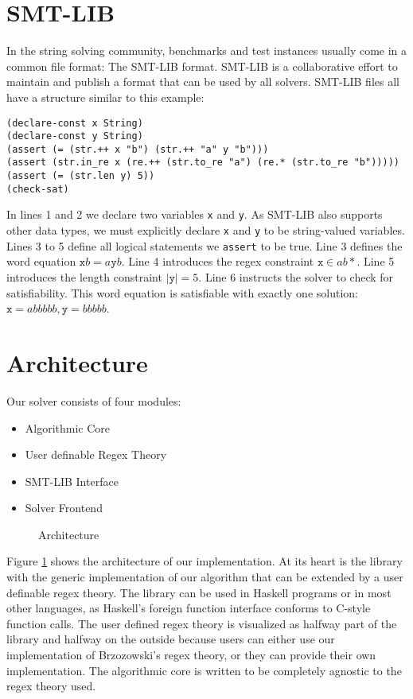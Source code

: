 \section{SMT-LIB}
In the string solving community, benchmarks and test instances usually come in a common file format: The SMT-LIB \cite{smtlib} format. SMT-LIB is a collaborative effort to maintain and publish a format that can be used by all solvers. SMT-LIB files all have a structure similar to this example:

\begin{verbatim}
(declare-const x String)
(declare-const y String)
(assert (= (str.++ x "b") (str.++ "a" y "b")))
(assert (str.in_re x (re.++ (str.to_re "a") (re.* (str.to_re "b")))))
(assert (= (str.len y) 5))
(check-sat)
\end{verbatim}

In lines 1 and 2 we declare two variables \texttt{x} and \texttt{y}. As SMT-LIB also supports other data types, we must explicitly declare \texttt{x} and \texttt{y} to be string-valued variables. Lines 3 to 5 define all logical statements we \texttt{assert} to be true. Line 3 defines the word equation $\texttt{x}b = a\texttt{y}b$. Line 4 introduces the regex constraint $\texttt{x} \in ab*$. Line 5 introduces the length constraint $|\texttt{y}| = 5$. Line 6 instructs the solver to check for satisfiability. This word equation is satisfiable with exactly one solution: $\texttt{x} = abbbbb, \texttt{y} = bbbbb$.

\section{Architecture}

Our solver consists of four modules:
\begin{itemize}
    \item Algorithmic Core
    \item User definable Regex Theory
    \item SMT-LIB Interface
    \item Solver Frontend
\end{itemize}

\begin{figure}%
\begin{center}

\caption{Architecture}
\label{fig:architecture}
\end{center}
\end{figure}

Figure \ref{fig:architecture} shows the architecture of our implementation. At its heart is the library with the generic implementation of our algorithm that can be extended by a user definable regex theory. The library can be used in Haskell programs or in most other languages, as Haskell's foreign function interface conforms to C-style function calls. The user defined regex theory is visualized as halfway part of the library and halfway on the outside because users can either use our implementation of Brzozowski's regex theory, or they can provide their own implementation. The algorithmic core is written to be completely agnostic to the regex theory used.

